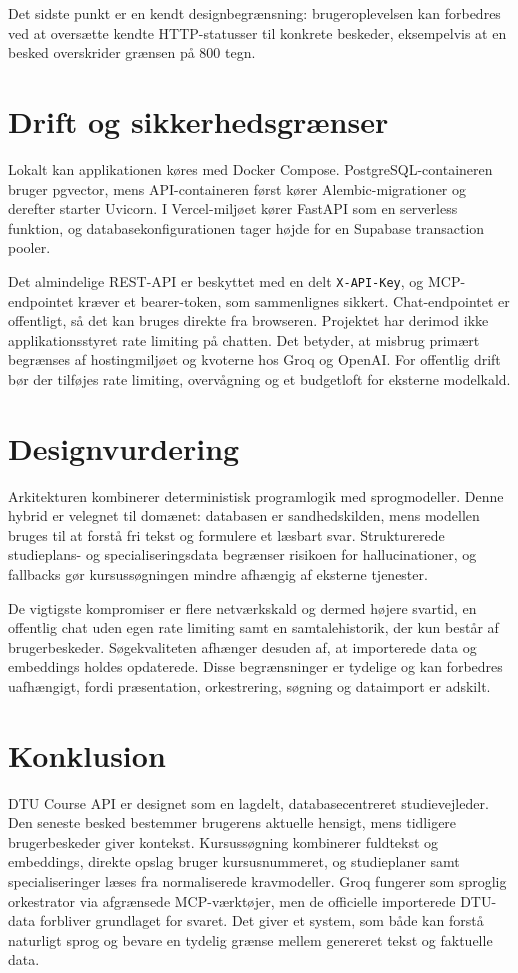 \documentclass[11pt,a4paper]{article}
\newcommand{\code}[1]{\texttt{#1}}
\begin{document}
Det sidste punkt er en kendt designbegrænsning: brugeroplevelsen kan forbedres
ved at oversætte kendte HTTP-statusser til konkrete beskeder, eksempelvis at
en besked overskrider grænsen på 800 tegn.

\section{Drift og sikkerhedsgrænser}

Lokalt kan applikationen køres med Docker Compose. PostgreSQL-containeren
bruger pgvector, mens API-containeren først kører Alembic-migrationer og
derefter starter Uvicorn. I Vercel-miljøet kører FastAPI som en serverless
funktion, og databasekonfigurationen tager højde for en Supabase transaction
pooler.

Det almindelige REST-API er beskyttet med en delt \code{X-API-Key}, og MCP-
endpointet kræver et bearer-token, som sammenlignes sikkert. Chat-endpointet er
offentligt, så det kan bruges direkte fra browseren. Projektet har derimod ikke
applikationsstyret rate limiting på chatten. Det betyder, at misbrug primært
begrænses af hostingmiljøet og kvoterne hos Groq og OpenAI. For offentlig drift
bør der tilføjes rate limiting, overvågning og et budgetloft for eksterne
modelkald.

\section{Designvurdering}

Arkitekturen kombinerer deterministisk programlogik med sprogmodeller. Denne
hybrid er velegnet til domænet: databasen er sandhedskilden, mens modellen
bruges til at forstå fri tekst og formulere et læsbart svar. Strukturerede
studieplans- og specialiseringsdata begrænser risikoen for hallucinationer, og
fallbacks gør kursussøgningen mindre afhængig af eksterne tjenester.

De vigtigste kompromiser er flere netværkskald og dermed højere svartid, en
offentlig chat uden egen rate limiting samt en samtalehistorik, der kun består
af brugerbeskeder. Søgekvaliteten afhænger desuden af, at importerede data og
embeddings holdes opdaterede. Disse begrænsninger er tydelige og kan forbedres
uafhængigt, fordi præsentation, orkestrering, søgning og dataimport er adskilt.

\section{Konklusion}

DTU Course API er designet som en lagdelt, databasecentreret studievejleder.
Den seneste besked bestemmer brugerens aktuelle hensigt, mens tidligere
brugerbeskeder giver kontekst. Kursussøgning kombinerer fuldtekst og embeddings,
direkte opslag bruger kursusnummeret, og studieplaner samt specialiseringer
læses fra normaliserede kravmodeller. Groq fungerer som sproglig orkestrator
via afgrænsede MCP-værktøjer, men de officielle importerede DTU-data forbliver
grundlaget for svaret. Det giver et system, som både kan forstå naturligt sprog
og bevare en tydelig grænse mellem genereret tekst og faktuelle data.
\end{document}
